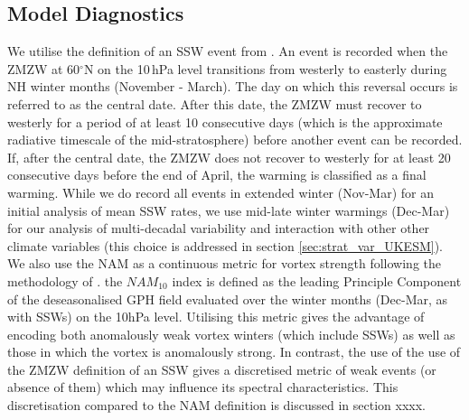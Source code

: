 \subsection{Model Diagnostics}
We utilise the definition of an SSW event from \cite{Butler2015}. An event is recorded when the ZMZW at 60$^\circ$N on the 10\,hPa level transitions from westerly to easterly during NH winter months (November - March). The day on which this reversal occurs is referred to as the central date. After this date, the ZMZW must recover to westerly for a period of at least 10 consecutive days (which is the approximate radiative timescale of the mid-stratosphere) before another event can be recorded.  If, after the central date, the ZMZW does not recover to westerly for at least 20 consecutive days before the end of April, the warming is classified as a final warming. While we do record all events in extended winter (Nov-Mar) for an initial analysis of mean SSW rates, we use mid-late winter warmings (Dec-Mar) for our analysis of multi-decadal variability and interaction with other other climate variables (this choice is addressed in section \ref{sec:strat_var_UKESM}). We also use the NAM as a continuous metric for vortex strength following the methodology of \cite{baldwinStratospheric2001}. the $NAM_{10}$ index is defined as the leading Principle Component of the deseasonalised GPH field evaluated over the winter months (Dec-Mar, as with SSWs) on the 10hPa level. Utilising this metric gives the advantage of encoding both anomalously weak vortex winters (which include SSWs) as well as those in which the vortex is anomalously strong. In contrast, the use of the use of the ZMZW definition of an SSW gives a discretised metric of weak events (or absence of them) which may influence its spectral characteristics. This discretisation compared to the NAM definition is discussed in section xxxx.

